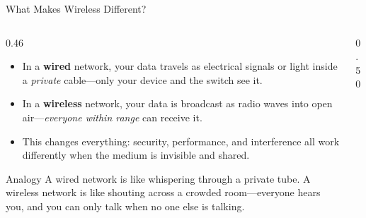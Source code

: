 \documentclass[aspectratio=169]{beamer}
\begin{document}

\begin{frame}{What Makes Wireless Different?}
    \begin{columns}[T]
        \begin{column}{0.46\textwidth}
            \footnotesize
            \begin{itemize}
                \item In a \textbf{wired} network, your data travels as electrical signals or light inside a \emph{private} cable---only your device and the switch see it.
                \item In a \textbf{wireless} network, your data is broadcast as radio waves into open air---\emph{everyone within range} can receive it.
                \item This changes everything: security, performance, and interference all work differently when the medium is invisible and shared.
            \end{itemize}
            \vspace{0.3em}
            \begin{exampleblock}{Analogy}
                \footnotesize
                A wired network is like whispering through a private tube. A wireless network is like shouting across a crowded room---everyone hears you, and you can only talk when no one else is talking.
            \end{exampleblock}
        \end{column}
        \begin{column}{0.50\textwidth}
            \begin{center}
\end{center}
\end{column}
\end{columns}
\end{frame}
\end{document}
